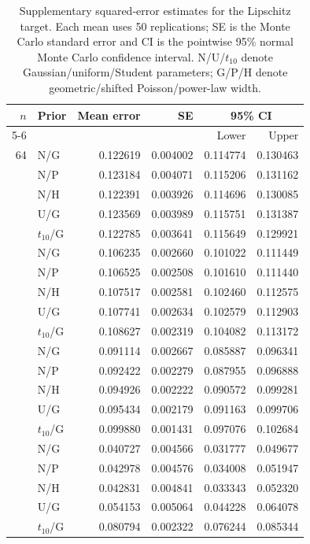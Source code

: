 \documentclass[11pt,a4paper]{article}
\theoremstyle{remark}
\begin{document}
\begin{table}[H]
\caption{Supplementary squared-error estimates for the Lipschitz target. Each mean uses 50 replications; SE is the Monte Carlo standard error and CI is the pointwise 95\% normal Monte Carlo confidence interval. N/U/$t_{10}$ denote Gaussian/uniform/Student parameters; G/P/H denote geometric/shifted Poisson/power-law width.}
\label{tab:supp-lipschitz}
\centering\small
\begin{tabular}{@{}rlrrrr@{}}
\toprule
$n$ & Prior & Mean error & SE & \multicolumn{2}{c}{95\% CI}\\
\cmidrule(l){5-6}
 & & & & Lower & Upper\\
\midrule
64 & N/G & 0.122619 & 0.004002 & 0.114774 & 0.130463\\
 & N/P & 0.123184 & 0.004071 & 0.115206 & 0.131162\\
 & N/H & 0.122391 & 0.003926 & 0.114696 & 0.130085\\
 & U/G & 0.123569 & 0.003989 & 0.115751 & 0.131387\\
 & $t_{10}$/G & 0.122785 & 0.003641 & 0.115649 & 0.129921\\
\addlinespace[3pt]
128 & N/G & 0.106235 & 0.002660 & 0.101022 & 0.111449\\
 & N/P & 0.106525 & 0.002508 & 0.101610 & 0.111440\\
 & N/H & 0.107517 & 0.002581 & 0.102460 & 0.112575\\
 & U/G & 0.107741 & 0.002634 & 0.102579 & 0.112903\\
 & $t_{10}$/G & 0.108627 & 0.002319 & 0.104082 & 0.113172\\
\addlinespace[3pt]
256 & N/G & 0.091114 & 0.002667 & 0.085887 & 0.096341\\
 & N/P & 0.092422 & 0.002279 & 0.087955 & 0.096888\\
 & N/H & 0.094926 & 0.002222 & 0.090572 & 0.099281\\
 & U/G & 0.095434 & 0.002179 & 0.091163 & 0.099706\\
 & $t_{10}$/G & 0.099880 & 0.001431 & 0.097076 & 0.102684\\
\addlinespace[3pt]
512 & N/G & 0.040727 & 0.004566 & 0.031777 & 0.049677\\
 & N/P & 0.042978 & 0.004576 & 0.034008 & 0.051947\\
 & N/H & 0.042831 & 0.004841 & 0.033343 & 0.052320\\
 & U/G & 0.054153 & 0.005064 & 0.044228 & 0.064078\\
 & $t_{10}$/G & 0.080794 & 0.002322 & 0.076244 & 0.085344\\

\end{tabular}
\end{table}
\end{document}
